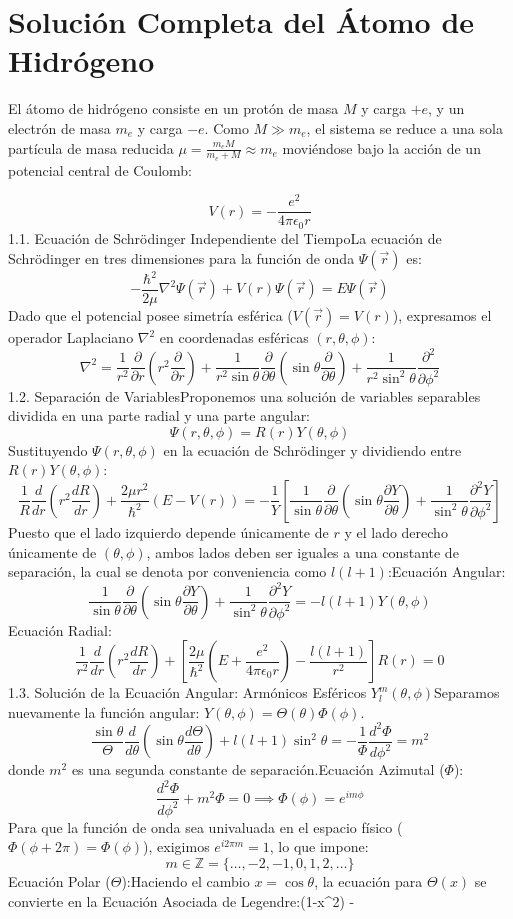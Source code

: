 \documentclass{article}
\begin{document}
\section{Solución Completa del Átomo de Hidrógeno}
El átomo de hidrógeno consiste en un protón de masa $M$ y carga $+e$, y un electrón de masa $m_e$ y carga $-e$. Como $M \gg m_e$, el sistema se reduce a una sola partícula de masa reducida $\mu = \frac{m_e M}{m_e + M} \approx m_e$ moviéndose bajo la acción de un potencial central de Coulomb:

$$V(r) = -\frac{e^2}{4\pi\epsilon_0 r}$$
1.1. Ecuación de Schrödinger Independiente del TiempoLa ecuación de Schrödinger en tres dimensiones para la función de onda $\Psi(\vec{r})$ es:$$-\frac{\hbar^2}{2\mu} \nabla^2 \Psi(\vec{r}) + V(r)\Psi(\vec{r}) = E\Psi(\vec{r})$$Dado que el potencial posee simetría esférica ($V(\vec{r}) = V(r)$), expresamos el operador Laplaciano $\nabla^2$ en coordenadas esféricas $(r, \theta, \phi)$:$$\nabla^2 = \frac{1}{r^2}\frac{\partial}{\partial r}\left(r^2 \frac{\partial}{\partial r}\right) + \frac{1}{r^2\sin\theta}\frac{\partial}{\partial\theta}\left(\sin\theta \frac{\partial}{\partial\theta}\right) + \frac{1}{r^2\sin^2\theta}\frac{\partial^2}{\partial\phi^2}$$1.2. Separación de VariablesProponemos una solución de variables separables dividida en una parte radial y una parte angular:$$\Psi(r, \theta, \phi) = R(r) Y(\theta, \phi)$$Sustituyendo $\Psi(r,\theta,\phi)$ en la ecuación de Schrödinger y dividiendo entre $R(r)Y(\theta,\phi)$:$$\frac{1}{R}\frac{d}{dr}\left(r^2 \frac{dR}{dr}\right) + \frac{2\mu r^2}{\hbar^2}\left(E - V(r)\right) = -\frac{1}{Y}\left[ \frac{1}{\sin\theta}\frac{\partial}{\partial\theta}\left(\sin\theta \frac{\partial Y}{\partial\theta}\right) + \frac{1}{\sin^2\theta}\frac{\partial^2 Y}{\partial\phi^2} \right]$$Puesto que el lado izquierdo depende únicamente de $r$ y el lado derecho únicamente de $(\theta, \phi)$, ambos lados deben ser iguales a una constante de separación, la cual se denota por conveniencia como $l(l+1)$:Ecuación Angular:$$\frac{1}{\sin\theta}\frac{\partial}{\partial\theta}\left(\sin\theta \frac{\partial Y}{\partial\theta}\right) + \frac{1}{\sin^2\theta}\frac{\partial^2 Y}{\partial\phi^2} = -l(l+1)Y(\theta,\phi)$$Ecuación Radial:$$\frac{1}{r^2}\frac{d}{dr}\left(r^2 \frac{dR}{dr}\right) + \left[ \frac{2\mu}{\hbar^2}\left(E + \frac{e^2}{4\pi\epsilon_0 r}\right) - \frac{l(l+1)}{r^2} \right]R(r) = 0$$1.3. Solución de la Ecuación Angular: Armónicos Esféricos $Y_l^m(\theta, \phi)$Separamos nuevamente la función angular: $Y(\theta, \phi) = \Theta(\theta)\Phi(\phi)$.$$\frac{\sin\theta}{\Theta}\frac{d}{d\theta}\left(\sin\theta \frac{d\Theta}{d\theta}\right) + l(l+1)\sin^2\theta = -\frac{1}{\Phi}\frac{d^2\Phi}{d\phi^2} = m^2$$donde $m^2$ es una segunda constante de separación.Ecuación Azimutal ($\Phi$):$$\frac{d^2\Phi}{d\phi^2} + m^2\Phi = 0 \implies \Phi(\phi) = e^{im\phi}$$Para que la función de onda sea univaluada en el espacio físico ($\Phi(\phi + 2\pi) = \Phi(\phi)$), exigimos $e^{i 2\pi m} = 1$, lo que impone:$$m \in \mathbb{Z} = \{\dots, -2, -1, 0, 1, 2, \dots\}$$Ecuación Polar ($\Theta$):Haciendo el cambio $x = \cos\theta$, la ecuación para $\Theta(x)$ se convierte en la Ecuación Asociada de Legendre:$$(1-x^2) - 
\end{document}

